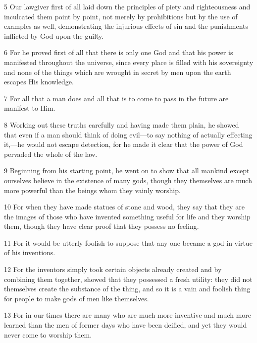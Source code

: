 \par 5 Our lawgiver first of all laid down the principles of piety and righteousness and inculcated them point by point, not merely by prohibitions but by the use of examples as well, demonstrating the injurious effects of sin and the punishments inflicted by God upon the guilty.

\par 6 For he proved first of all that there is only one God and that his power is manifested throughout the universe, since every place is filled with his sovereignty and none of the things which are wrought in secret by men upon the earth escapes His knowledge.

\par 7 For all that a man does and all that is to come to pass in the future are manifest to Him.

\par 8 Working out these truths carefully and having made them plain, he showed that even if a man should think of doing evil—to say nothing of actually effecting it,—he would not escape detection, for he made it clear that the power of God pervaded the whole of the law.

\par 9 Beginning from his starting point, he went on to show that all mankind except ourselves believe in the existence of many gods, though they themselves are much more powerful than the beings whom they vainly worship.

\par 10 For when they have made statues of stone and wood, they say that they are the images of those who have invented something useful for life and they worship them, though they have clear proof that they possess no feeling.

\par 11 For it would be utterly foolish to suppose that any one became a god in virtue of his inventions.

\par 12 For the inventors simply took certain objects already created and by combining them together, showed that they possessed a fresh utility: they did not themselves create the substance of the thing, and so it is a vain and foolish thing for people to make gods of men like themselves.

\par 13 For in our times there are many who are much more inventive and much more learned than the men of former days who have been deified, and yet they would never come to worship them.

